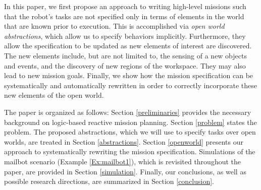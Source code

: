 In this paper, we first propose an approach to writing high-level missions such that the robot's tasks are not specified only in terms of elements in the world that are known prior to execution. This is accomplished via \emph{open world abstractions}, which allow us to specify behaviors implicitly. 
Furthermore, they allow the specification to be updated as new elements of interest are discovered. The new elements include, but are not limited to, the sensing of a new objects and events, and the discovery of new regions of the workspace. They may also lead to new mission goals.
Finally, we show how the mission specification can be systematically and automatically rewritten in order to correctly incorporate these new elements of the open world. 

The paper is organized as follows: Section \ref{preliminaries} provides the necessary background on logic-based reactive mission planning. Section \ref{problem} states the problem. The proposed abstractions, which we will use to specify tasks over open worlds, are treated in Section \ref{abstractions}. Section \ref{openworld} presents our approach to systematically rewriting the mission specification. Simulations of the mailbot scenario (Example \ref{Ex:mailbot1}), which is revisited throughout the paper, are provided in Section \ref{simulation}. Finally, our conclusions, as well as possible research directions, are summarized in Section \ref{conclusion}.

